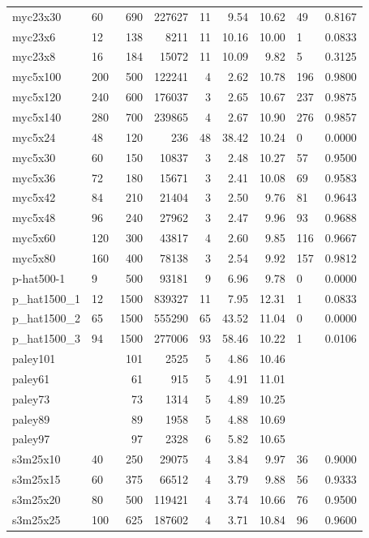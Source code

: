 \begin{longtable}{llrrrrrll}
myc23x30 & 60 & 690 & 227627 & 11 & 9.54 & 10.62 & 49 & 0.8167 \\
myc23x6 & 12 & 138 & 8211 & 11 & 10.16 & 10.00 & 1 & 0.0833 \\
myc23x8 & 16 & 184 & 15072 & 11 & 10.09 & 9.82 & 5 & 0.3125 \\
myc5x100 & 200 & 500 & 122241 & 4 & 2.62 & 10.78 & 196 & 0.9800 \\
myc5x120 & 240 & 600 & 176037 & 3 & 2.65 & 10.67 & 237 & 0.9875 \\
myc5x140 & 280 & 700 & 239865 & 4 & 2.67 & 10.90 & 276 & 0.9857 \\
myc5x24 & 48 & 120 & 236 & 48 & 38.42 & 10.24 & 0 & 0.0000 \\
myc5x30 & 60 & 150 & 10837 & 3 & 2.48 & 10.27 & 57 & 0.9500 \\
myc5x36 & 72 & 180 & 15671 & 3 & 2.41 & 10.08 & 69 & 0.9583 \\
myc5x42 & 84 & 210 & 21404 & 3 & 2.50 & 9.76 & 81 & 0.9643 \\
myc5x48 & 96 & 240 & 27962 & 3 & 2.47 & 9.96 & 93 & 0.9688 \\
myc5x60 & 120 & 300 & 43817 & 4 & 2.60 & 9.85 & 116 & 0.9667 \\
myc5x80 & 160 & 400 & 78138 & 3 & 2.54 & 9.92 & 157 & 0.9812 \\
p-hat500-1 & 9 & 500 & 93181 & 9 & 6.96 & 9.78 & 0 & 0.0000 \\
p\_hat1500\_1 & 12 & 1500 & 839327 & 11 & 7.95 & 12.31 & 1 & 0.0833 \\
p\_hat1500\_2 & 65 & 1500 & 555290 & 65 & 43.52 & 11.04 & 0 & 0.0000 \\
p\_hat1500\_3 & 94 & 1500 & 277006 & 93 & 58.46 & 10.22 & 1 & 0.0106 \\
paley101 &  & 101 & 2525 & 5 & 4.86 & 10.46 &  &  \\
paley61 &  & 61 & 915 & 5 & 4.91 & 11.01 &  &  \\
paley73 &  & 73 & 1314 & 5 & 4.89 & 10.25 &  &  \\
paley89 &  & 89 & 1958 & 5 & 4.88 & 10.69 &  &  \\
paley97 &  & 97 & 2328 & 6 & 5.82 & 10.65 &  &  \\
s3m25x10 & 40 & 250 & 29075 & 4 & 3.84 & 9.97 & 36 & 0.9000 \\
s3m25x15 & 60 & 375 & 66512 & 4 & 3.79 & 9.88 & 56 & 0.9333 \\
s3m25x20 & 80 & 500 & 119421 & 4 & 3.74 & 10.66 & 76 & 0.9500 \\
s3m25x25 & 100 & 625 & 187602 & 4 & 3.71 & 10.84 & 96 & 0.9600 \\

\end{longtable}
